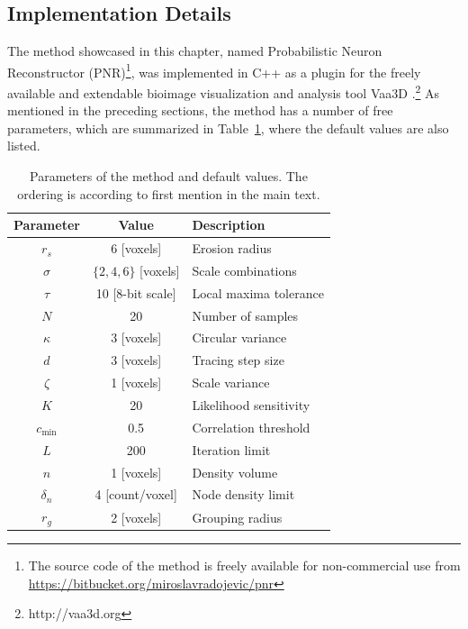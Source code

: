 \subsection{Implementation Details}
\label{subsec:implementation}
The method showcased in this chapter, named Probabilistic Neuron Reconstructor (PNR)\footnote{The source code of the method is freely available for non-commercial use from \url{https://bitbucket.org/miroslavradojevic/pnr}}, was implemented in C++ as a plugin for the freely available and extendable bioimage visualization and analysis tool Vaa3D \cite{peng2010v3d, peng2014extensible}.\footnote{http://vaa3d.org} As mentioned in the preceding sections, the method has a number of free parameters, which are summarized in Table~\ref{tab:params}, where the default values are also listed.
\begin{table}
	\small\centering
	\begin{tabular}{@{}c@{\hspace{1em}}c@{\hspace{2em}}l@{}}
		\hline
		Parameter & Value & Description \\
		\hline
		$r_s$ & 6 [voxels] & Erosion radius \\
		$\sigma$ & $\{ 2,4,6 \}$ [voxels]  & Scale combinations \\ %
		$\tau$ & 10 [8-bit scale] & Local maxima tolerance \\ %
		$N$ & 20 & Number of samples \\
		$\kappa$ & 3 [voxels] & Circular variance \\
		$d$ & 3 [voxels] & Tracing step size \\
		$\zeta$ & 1 [voxels] & Scale variance \\
		$K$ & 20 & Likelihood sensitivity \\
		$c_{\text{min}}$ & 0.5 & Correlation threshold \\ %
		$L$ & 200 & Iteration limit \\
		$n$ & 1 [voxels] & Density volume \\
		$\delta_n$ & 4 [count/voxel] & Node density limit \\
		$r_g$ & 2 [voxels] & Grouping radius \\
		\hline
	\end{tabular}
	\caption{Parameters of the method and default values. The ordering is according to first mention in the main text.}
	\label{tab:params}
\end{table}

